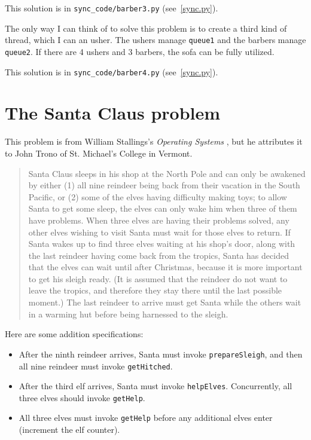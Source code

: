 \documentclass{book}
\begin{document}
This solution is in \verb"sync_code/barber3.py" (see~\ref{sync.py}).

The only way I can think of to solve this problem is to create a third
kind of thread, which I can an usher.  The ushers manage {\tt queue1}
and the barbers manage {\tt queue2}.  If there are 4 ushers and 3 barbers,
the sofa can be fully utilized.

This solution is in \verb"sync_code/barber4.py" (see~\ref{sync.py}).



\section{The Santa Claus problem}

This problem is from William Stallings's
{\em Operating Systems} \cite{stallings},
but he attributes it to John Trono of St. Michael's College in
Vermont.

\begin{quotation}
    Santa Claus sleeps in his shop at the North Pole and can only be
    awakened by either (1) all nine reindeer being back from their
    vacation in the South Pacific, or (2) some of the elves having
    difficulty making toys; to allow Santa to get some sleep, the elves
    can only wake him when three of them have problems.  When three elves
    are having their problems solved, any other elves wishing to visit
    Santa must wait for those elves to return.  If Santa wakes up to find
    three elves waiting at his shop's door, along with the last reindeer
    having come back from the tropics, Santa has decided that the elves can
    wait until after Christmas, because it is more important to get his
    sleigh ready.  (It is assumed that the reindeer do not want to leave
    the tropics, and therefore they stay there until the last possible
    moment.)  The last reindeer to arrive must get Santa while the others
    wait in a warming hut before being harnessed to the sleigh.
\end{quotation}

Here are some addition specifications:

\begin {itemize}

\item After the ninth reindeer arrives, Santa must invoke
    {\tt prepareSleigh}, and then all nine reindeer must
invoke {\tt getHitched}.

\item After the third elf arrives, Santa must invoke {\tt helpElves}.
Concurrently, all three elves should invoke {\tt getHelp}.

\item All three elves must invoke {\tt getHelp} before any additional
elves enter (increment the elf counter).

\end {itemize}
\end{document}
